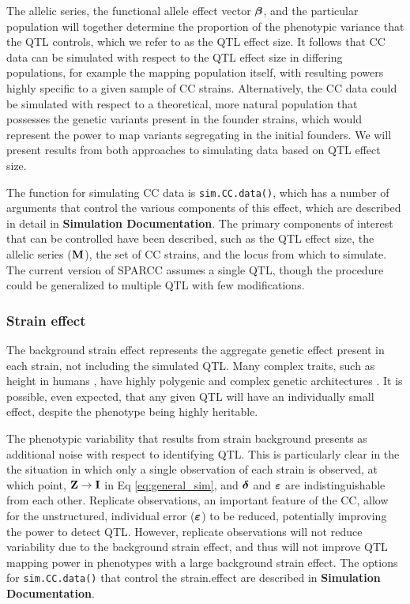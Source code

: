 The allelic series, the functional allele effect vector $\boldsymbol{\beta}$, and the particular population will together determine the proportion of the phenotypic variance that the QTL controls, which we refer to as the QTL effect size. It follows that CC data can be simulated with respect to the QTL effect size in differing populations, for example the mapping population itself, with resulting powers highly specific to a given sample of CC strains. Alternatively, the CC data could be simulated with respect to a theoretical, more natural population that possesses the genetic variants present in the founder strains, which would represent the power to map variants segregating in the initial founders. We will present results from both approaches to simulating data based on QTL effect size.  

The function for simulating CC data is \texttt{sim.CC.data()}, which has a number of arguments that control the various components of this effect, which are described in detail in \textbf{Simulation Documentation}. The primary components of interest that can be controlled have been described, such as the QTL effect size, the allelic series ($\mathbf{M}$), the set of CC strains, and the locus from which to simulate. The current version of SPARCC assumes a single QTL, though the procedure could be generalized to multiple QTL with few modifications. 

\subsubsection{Strain effect}

The background strain effect represents the aggregate genetic effect present in each strain, not including the simulated QTL. Many complex traits, such as height in humans \citep{Wood2014}, have highly polygenic and complex genetic architectures \citep{Phillippi2014}. It is possible, even expected, that any given QTL will have an individually small effect, despite the phenotype being highly heritable.

The phenotypic variability that results from strain background presents as additional noise with respect to identifying QTL. This is particularly clear in the the situation in which only a single observation of each strain is observed, at which point, $\mathbf{Z} \rightarrow \mathbf{I}$ in Eq \ref{eq:general_sim}, and $\boldsymbol{\delta}$ and $\boldsymbol{\varepsilon}$ are indistinguishable from each other. Replicate observations, an important feature of the CC, allow for the unstructured, individual error ($\boldsymbol{\varepsilon}$) to be reduced, potentially improving the power to detect QTL. However, replicate observations will not reduce variability due to the background strain effect, and thus will not improve QTL mapping power in phenotypes with a large background strain effect. The options for \texttt{sim.CC.data()} that control the strain.effect are described in \textbf{Simulation Documentation}.


